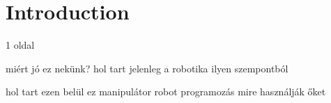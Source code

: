 \newpage

\thispagestyle{empty}

\chapter{Introduction}

1 oldal

miért jó ez nekünk?
hol tart jelenleg a robotika ilyen szempontból

hol tart ezen belül ez manipulátor robot programozás
mire használják őket